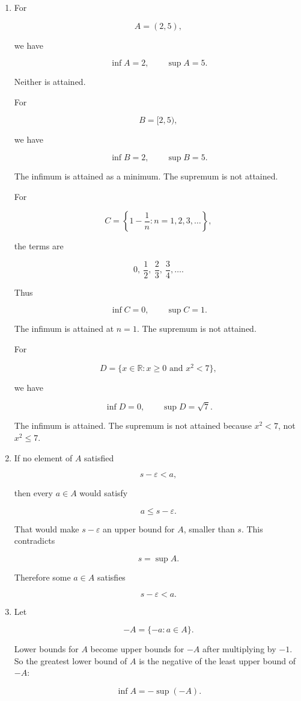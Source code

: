 \begin{enumerate}
\item
For

\[
A=(2,5),
\]

we have

\[
\inf A=2,
\qquad
\sup A=5.
\]

Neither is attained.

For

\[
B=[2,5),
\]

we have

\[
\inf B=2,
\qquad
\sup B=5.
\]

The infimum is attained as a minimum.  The supremum is not attained.

For

\[
C=\left\{1-\frac1n:n=1,2,3,\ldots\right\},
\]

the terms are

\[
0,\ \frac12,\ \frac23,\ \frac34,\ldots.
\]

Thus

\[
\inf C=0,
\qquad
\sup C=1.
\]

The infimum is attained at \(n=1\).  The supremum is not attained.

For

\[
D=\{x\in\mathbb R:x\ge0\text{ and }x^2<7\},
\]

we have

\[
\inf D=0,
\qquad
\sup D=\sqrt7.
\]

The infimum is attained.  The supremum is not attained because \(x^2<7\), not
\(x^2\le7\).

\item
If no element of \(A\) satisfied

\[
s-\varepsilon<a,
\]

then every \(a\in A\) would satisfy

\[
a\le s-\varepsilon.
\]

That would make \(s-\varepsilon\) an upper bound for \(A\), smaller than \(s\).  This
contradicts

\[
s=\sup A.
\]

Therefore some \(a\in A\) satisfies

\[
s-\varepsilon<a.
\]

\item
Let

\[
-A=\{-a:a\in A\}.
\]

Lower bounds for \(A\) become upper bounds for \(-A\) after multiplying by \(-1\).
So the greatest lower bound of \(A\) is the negative of the least upper bound of
\(-A\):

\[
\inf A=-\sup(-A).
\]
\end{enumerate}

